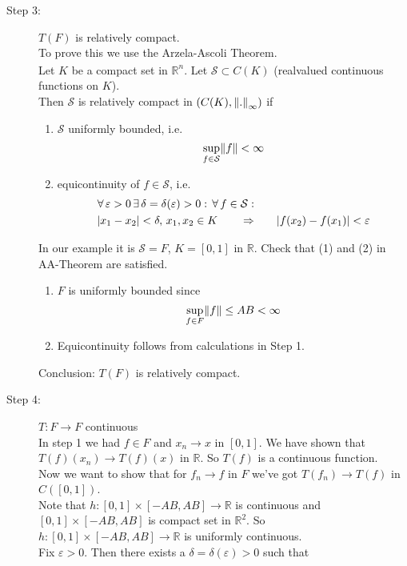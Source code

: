 \begin{beispiel}
\begin{description}
	\item[Step 3:] $T(F)$ is relatively compact. \\
	To prove this we use the Arzela-Ascoli Theorem. \\
	$\phantom{...}$ \\
	Let $K$ be a compact set in $\mathbb{R}^n$. Let $\mathcal{S} \subset C(K)$ (realvalued continuous functions on $K$). \\
	Then $\mathcal{S}$ is relatively compact in $(C(K),\norm{.}_{\infty})$ if 
	\begin{enumerate}[(1)]
		\item $\mathcal{S}$ uniformly bounded, i.e.
		\[
			\sup_{f \in \mathcal{S}} \norm{f} < \infty
		\]
		\item equicontinuity of $f \in \mathcal{S}$, i.e.
		\begin{align*}
			\forall\, \varepsilon>0 \,\exists\, \delta = \delta (\varepsilon) >0: \,\forall\,  f \in \mathcal{S}: & \\
			\lvert x_1-x_2\rvert < \delta, \, x_1,x_2 \in K \qquad \Rightarrow & \qquad \lvert f(x_2)-f(x_1)\rvert< \varepsilon
		\end{align*}
	\end{enumerate}
	In our example it is $\mathcal{S} = F$, $K = [0,1]$ in $\mathbb{R}$. Check that (1) and (2) in AA-Theorem are satisfied. \\
	\begin{enumerate}[(1)]
		\item $F$ is uniformly bounded since
	\[
		\sup_{f \in F}\norm{f} \leq AB < \infty
	\]
	\item Equicontinuity follows from calculations in Step 1. \\
	\end{enumerate}	
	Conclusion: $T(F)$ is relatively compact.
	\item[Step 4:] $T: F \to F$ continuous \\
	In step 1 we had $f \in F$ and $x_n \to x$ in $[0,1]$. We have shown that $T(f)(x_n) \to T(f)(x)$ in $\mathbb{R}$. So $T(f)$ is a continuous function. \\
	Now we want to show that for $f_n \to f$ in $F$ we've got $T(f_n) \to T(f)$ in $C([0,1])$. \\
	Note that $h: [0,1] \times [-AB,AB] \to \mathbb{R}$ is continuous and $[0,1] \times [-AB,AB]$ is compact set in $\mathbb{R}^2$. So $h: [0,1] \times [-AB,AB] \to \mathbb{R}$ is uniformly continuous. \\
	Fix $\varepsilon >0$. Then there exists a $\delta = \delta (\varepsilon) >0$ such that

\end{description}
\end{beispiel}
